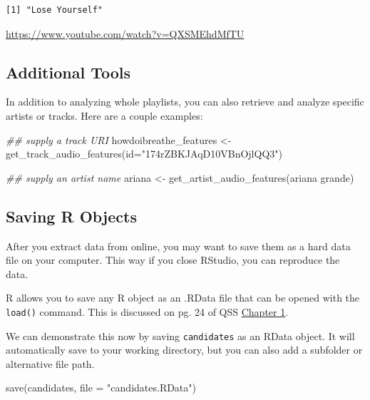 \documentclass[
  letterpaper,
  DIV=11,
  numbers=noendperiod]{scrreprt}
\newenvironment{Shaded}{\begin{snugshade}}{\end{snugshade}}
\newcommand{\AttributeTok}[1]{\textcolor[rgb]{0.40,0.45,0.13}{#1}}
\newcommand{\DocumentationTok}[1]{\textcolor[rgb]{0.37,0.37,0.37}{\textit{#1}}}
\newcommand{\FunctionTok}[1]{\textcolor[rgb]{0.28,0.35,0.67}{#1}}
\newcommand{\NormalTok}[1]{\textcolor[rgb]{0.00,0.23,0.31}{#1}}
\newcommand{\OtherTok}[1]{\textcolor[rgb]{0.00,0.23,0.31}{#1}}
\newcommand{\StringTok}[1]{\textcolor[rgb]{0.13,0.47,0.30}{#1}}
\begin{document}
\begin{verbatim}
[1] "Lose Yourself"
\end{verbatim}

\url{https://www.youtube.com/watch?v=QXSMEhdMfTU}

\hypertarget{additional-tools}{%
\subsection{Additional Tools}\label{additional-tools}}

In addition to analyzing whole playlists, you can also retrieve and
analyze specific artists or tracks. Here are a couple examples:

\begin{Shaded}
\begin{Highlighting}[]
\DocumentationTok{\#\# supply a track URI}
\NormalTok{howdoibreathe\_features }\OtherTok{\textless{}{-}} \FunctionTok{get\_track\_audio\_features}\NormalTok{(}\AttributeTok{id=}\StringTok{"174rZBKJAqD10VBnOjlQQ3"}\NormalTok{)}

\DocumentationTok{\#\# supply an artist name}
\NormalTok{ariana }\OtherTok{\textless{}{-}} \FunctionTok{get\_artist\_audio\_features}\NormalTok{(}\StringTok{\textquotesingle{}ariana grande\textquotesingle{}}\NormalTok{)}
\end{Highlighting}
\end{Shaded}

\hypertarget{saving-r-objects}{%
\subsection{Saving R Objects}\label{saving-r-objects}}

After you extract data from online, you may want to save them as a hard
data file on your computer. This way if you close RStudio, you can
reproduce the data.

R allows you to save any R object as an .RData file that can be opened
with the \texttt{load()} command. This is discussed on pg. 24 of QSS
\href{https://assets.press.princeton.edu/chapters/s11025.pdf}{Chapter
1}.

We can demonstrate this now by saving \texttt{candidates} as an RData
object. It will automatically save to your working directory, but you
can also add a subfolder or alternative file path.

\begin{Shaded}
\begin{Highlighting}[]
\FunctionTok{save}\NormalTok{(candidates, }\AttributeTok{file =} \StringTok{"candidates.RData"}\NormalTok{)}
\end{Highlighting}
\end{Shaded}
\end{document}
